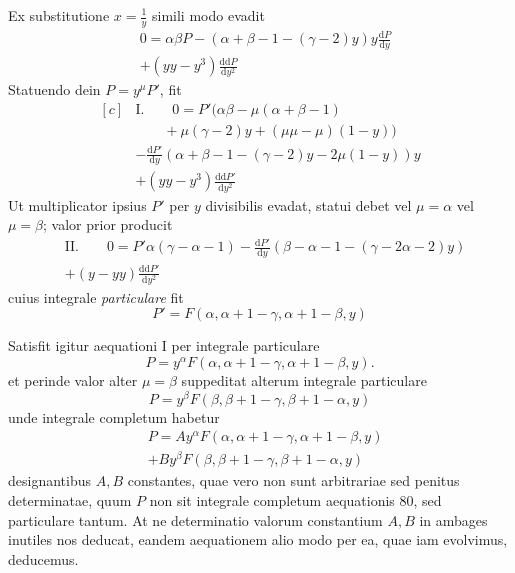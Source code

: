 Ex substitutione \(x=\frac{1}{y}\) simili modo evadit
\[
\begin{aligned}&0=\alpha\beta P-(\alpha+\beta-1-(\gamma-2)y)y\frac{\mathrm{d}P}{\mathrm{d}y}\\&+(yy-y^3)\frac{\mathrm{d}\mathrm{d}P}{\mathrm{d}y^2}\end{aligned}
\]
Statuendo dein \(P=y^\mu P'\), fit
\[
\begin{aligned}[c]
&\mathrm{I.}\qquad 0=P'(\alpha\beta-\mu(\alpha+\beta-1)\\&\qquad+\mu(\gamma-2)y+(\mu\mu-\mu)(1-y))\\
&-\frac{\mathrm{d}P'}{\mathrm{d}y}(\alpha+\beta-1-(\gamma-2)y-2\mu(1-y))y\\
&+(yy-y^3)\frac{\mathrm{d}\mathrm{d}P'}{\mathrm{d}y^2}
\end{aligned}
\]
Ut multiplicator ipsius \(P'\) per \(y\) divisibilis evadat, statui debet vel \(\mu=\alpha\) vel
\(\mu=\beta\); valor prior producit
\[
\begin{aligned}&\mathrm{II.}\qquad
0=P'\alpha(\gamma-\alpha-1)-\frac{\mathrm{d}P'}{\mathrm{d}y}(\beta-\alpha-1-(\gamma-2\alpha-2)y)\\&+(y-yy)\frac{\mathrm{d}\mathrm{d}P'}{\mathrm{d}y^2}\end{aligned}
\]
cuius integrale \textit{particulare} fit
\[
P'=F(\alpha,\alpha+1-\gamma,\alpha+1-\beta,y)
\]
\par{}
Satisfit igitur aequationi I per integrale particulare
\[
P=y^\alpha F(\alpha,\alpha+1-\gamma,\alpha+1-\beta,y).
\]
et perinde valor alter \(\mu=\beta\) suppeditat alterum integrale particulare
\[
P=y^\beta F(\beta,\beta+1-\gamma,\beta+1-\alpha,y)
\]
unde integrale completum habetur
\[
\begin{aligned}&P=Ay^\alpha F(\alpha,\alpha+1-\gamma,\alpha+1-\beta,y)\\&+By^\beta F(\beta,\beta+1-\gamma,\beta+1-\alpha,y)\end{aligned}
\]
designantibus \(A,B\) constantes, quae vero non sunt arbitrariae sed penitus determinatae, quum \(P\) non sit integrale completum aequationis 80, sed particulare tantum. At ne determinatio valorum constantium \(A,B\) in ambages inutiles nos deducat, eandem aequationem alio modo per ea, quae iam evolvimus, deducemus.

